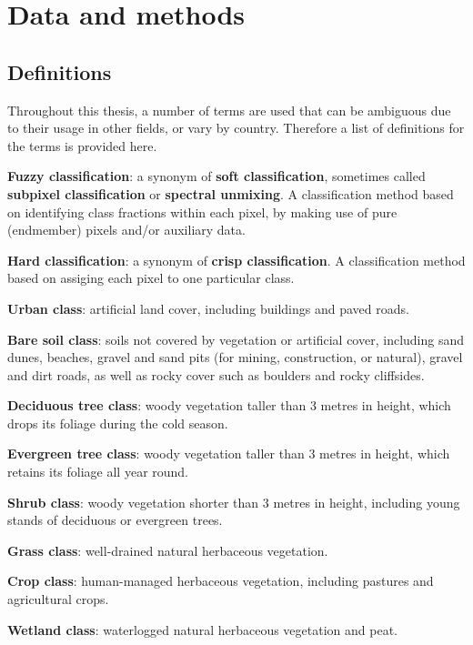 \documentclass[a4paper,10pt]{book}
\begin{document}
\chapter{Data and methods}

\section{Definitions}

Throughout this thesis, a number of terms are used that can be ambiguous due to their usage in other fields, or vary by country. Therefore a list of definitions for the terms is provided here.

\textbf{Fuzzy classification}: a synonym of \textbf{soft classification}, sometimes called \textbf{subpixel classification} or \textbf{spectral unmixing}. A classification method based on identifying class fractions within each pixel, by making use of pure (endmember) pixels and/or auxiliary data.

\textbf{Hard classification}: a synonym of \textbf{crisp classification}. A classification method based on assiging each pixel to one particular class.

\textbf{Urban class}: artificial land cover, including buildings and paved roads.

\textbf{Bare soil class}: soils not covered by vegetation or artificial cover, including sand dunes, beaches, gravel and sand pits (for mining, construction, or natural), gravel and dirt roads, as well as rocky cover such as boulders and rocky cliffsides.

\textbf{Deciduous tree class}: woody vegetation taller than 3 metres in height, which drops its foliage during the cold season.

\textbf{Evergreen tree class}: woody vegetation taller than 3 metres in height, which retains its foliage all year round.

\textbf{Shrub class}: woody vegetation shorter than 3 metres in height, including young stands of deciduous or evergreen trees.

\textbf{Grass class}: well-drained natural herbaceous vegetation.

\textbf{Crop class}: human-managed herbaceous vegetation, including pastures and agricultural crops.

\textbf{Wetland class}: waterlogged natural herbaceous vegetation and peat.
\end{document}
